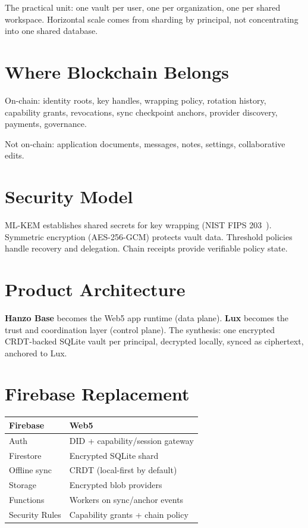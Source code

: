 \documentclass[twocolumn,11pt]{article}
\begin{document}
The practical unit: one vault per user, one per organization, one per shared workspace. Horizontal scale comes from sharding by principal, not concentrating into one shared database.

\section{Where Blockchain Belongs}

On-chain: identity roots, key handles, wrapping policy, rotation history, capability grants, revocations, sync checkpoint anchors, provider discovery, payments, governance.

Not on-chain: application documents, messages, notes, settings, collaborative edits.

\section{Security Model}

ML-KEM establishes shared secrets for key wrapping (NIST FIPS 203~\cite{nist-mlkem}). Symmetric encryption (AES-256-GCM) protects vault data. Threshold policies handle recovery and delegation. Chain receipts provide verifiable policy state.

\section{Product Architecture}

\textbf{Hanzo Base} becomes the Web5 app runtime (data plane). \textbf{Lux} becomes the trust and coordination layer (control plane). The synthesis: one encrypted CRDT-backed SQLite vault per principal, decrypted locally, synced as ciphertext, anchored to Lux.

\section{Firebase Replacement}

\begin{center}
\begin{tabular}{ll}
\toprule
\textbf{Firebase} & \textbf{Web5} \\
\midrule
Auth & DID + capability/session gateway \\
Firestore & Encrypted SQLite shard \\
Offline sync & CRDT (local-first by default) \\
Storage & Encrypted blob providers \\
Functions & Workers on sync/anchor events \\
Security Rules & Capability grants + chain policy \\
\bottomrule
\end{tabular}
\end{center}
\end{document}
